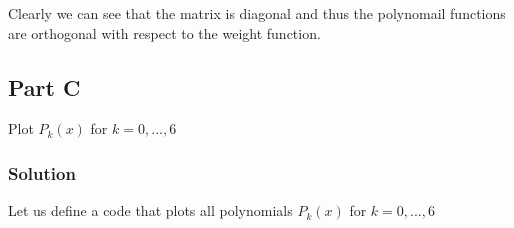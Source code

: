 \documentclass[
]{article}
\begin{document}
\begin{figure}


\caption{\label{fig-q1pb}}

\end{figure}%

Clearly we can see that the matrix is diagonal and thus the polynomail
functions are orthogonal with respect to the weight function.

\subsection{Part C}\label{part-c}

Plot \(P_k(x)\) for \(k = 0, ..., 6\)

\subsubsection{Solution}\label{solution-2}

Let us define a code that plots all polynomials \(P_k(x)\) for
\(k = 0, ..., 6\)
\end{document}
